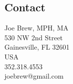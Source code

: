 \documentclass{article}
\begin{document}
\begin{multicols}{2}

\subsection*{Contact}
Joe Brew, MPH, MA\\
530 NW 2nd Street \\
Gainesville, FL 32601 \\
USA \\
352.318.4553 \\
joebrew@gmail.com


\end{multicols}
% 
% 
\end{document}
